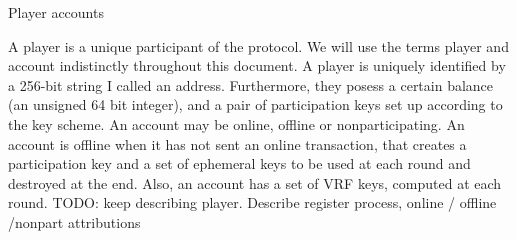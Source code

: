 \documentclass[10pt,a4paper]{article}
\begin{document}
\begin{section}{Player accounts}

A player is a unique participant of the protocol. We will
use the terms player and account indistinctly throughout this document.
A player is uniquely identified by a 256-bit string I called an address.
Furthermore, they posess a certain balance (an unsigned 64 bit integer), 
and a pair of participation keys set up according to the key scheme. An account may be online, 
offline or nonparticipating.
An account is offline when it has not sent an online transaction, that creates
a participation key and a set of ephemeral keys to be used at each round and
destroyed at the end.
Also, an account has a set of VRF keys, computed at each round.
TODO: keep describing player. Describe register process, online / offline /nonpart attributions

\end{section}
\end{document}
